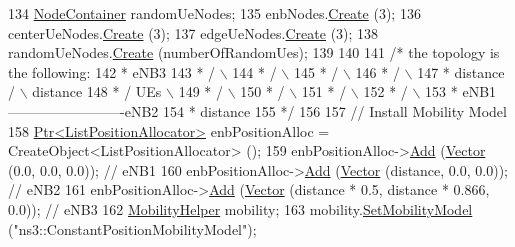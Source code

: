 \begin{DoxyCode}
134   \hyperlink{classns3_1_1NodeContainer}{NodeContainer} randomUeNodes;
135   enbNodes.\hyperlink{classns3_1_1NodeContainer_a787f059e2813e8b951cc6914d11dfe69}{Create} (3);
136   centerUeNodes.\hyperlink{classns3_1_1NodeContainer_a787f059e2813e8b951cc6914d11dfe69}{Create} (3);
137   edgeUeNodes.\hyperlink{classns3_1_1NodeContainer_a787f059e2813e8b951cc6914d11dfe69}{Create} (3);
138   randomUeNodes.\hyperlink{classns3_1_1NodeContainer_a787f059e2813e8b951cc6914d11dfe69}{Create} (numberOfRandomUes);
139 
140 
141 \textcolor{comment}{/*   the topology is the following:}
142 \textcolor{comment}{ *                 eNB3}
143 \textcolor{comment}{ *                /     \(\backslash\)}
144 \textcolor{comment}{ *               /       \(\backslash\)}
145 \textcolor{comment}{ *              /         \(\backslash\)}
146 \textcolor{comment}{ *             /           \(\backslash\)}
147 \textcolor{comment}{ *   distance /             \(\backslash\) distance}
148 \textcolor{comment}{ *           /      UEs      \(\backslash\)}
149 \textcolor{comment}{ *          /                 \(\backslash\)}
150 \textcolor{comment}{ *         /                   \(\backslash\)}
151 \textcolor{comment}{ *        /                     \(\backslash\)}
152 \textcolor{comment}{ *       /                       \(\backslash\)}
153 \textcolor{comment}{ *   eNB1-------------------------eNB2}
154 \textcolor{comment}{ *                  distance}
155 \textcolor{comment}{ */}
156 
157   \textcolor{comment}{// Install Mobility Model}
158   \hyperlink{classns3_1_1Ptr}{Ptr<ListPositionAllocator>} enbPositionAlloc = 
      CreateObject<ListPositionAllocator> ();
159   enbPositionAlloc->\hyperlink{classns3_1_1ListPositionAllocator_a460e82f015ac012a73ba0ea0cccb3486}{Add} (\hyperlink{classns3_1_1Vector3D_a7e59b47bc94c9cb1dadff68c1d0112d8}{Vector} (0.0, 0.0, 0.0));                       \textcolor{comment}{// eNB1}
160   enbPositionAlloc->\hyperlink{classns3_1_1ListPositionAllocator_a460e82f015ac012a73ba0ea0cccb3486}{Add} (\hyperlink{classns3_1_1Vector3D_a7e59b47bc94c9cb1dadff68c1d0112d8}{Vector} (distance,  0.0, 0.0));                 \textcolor{comment}{// eNB2}
161   enbPositionAlloc->\hyperlink{classns3_1_1ListPositionAllocator_a460e82f015ac012a73ba0ea0cccb3486}{Add} (\hyperlink{classns3_1_1Vector3D_a7e59b47bc94c9cb1dadff68c1d0112d8}{Vector} (distance * 0.5, distance * 0.866, 0.0));   \textcolor{comment}{// eNB3}
162   \hyperlink{classns3_1_1MobilityHelper}{MobilityHelper} mobility;
163   mobility.\hyperlink{classns3_1_1MobilityHelper_a030275011b6f40682e70534d30280aba}{SetMobilityModel} (\textcolor{stringliteral}{"ns3::ConstantPositionMobilityModel"});

\end{DoxyCode}
